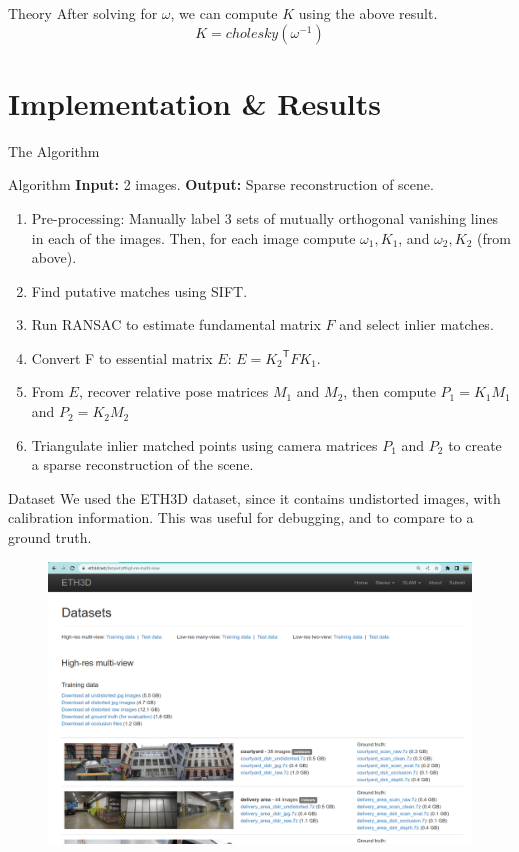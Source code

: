 \documentclass{beamer}
\begin{document}
\begin{frame}{Theory }
After solving for $ \omega $, we can compute $ K $ using the above result.
\[
K = cholesky\left(\omega^{-1}\right)
\]
\end{frame}

\section{Implementation \& Results}
\begin{frame}{The Algorithm}

\begin{block}{Algorithm}
\textbf{Input:} 2 images. \textbf{Output: }Sparse reconstruction of scene.
\begin{enumerate}
    \item Pre-processing: Manually label 3 sets of mutually orthogonal vanishing lines in each of the images. Then, for each image compute $ \omega_1, K_1 $, and $ \omega_2, K_2 $ (from above).
	\item Find putative matches using SIFT.
	\item Run RANSAC to estimate fundamental matrix $ F $ and select inlier matches.
	\item Convert F to essential matrix $ E $: $ E = {K_2}^\mathsf{T} F K_1 $.
	\item From $ E $, recover relative pose matrices $ M_1 $ and $ M_2 $, then compute $ P_1 = K_1 M_1 $ and $ P_2 = K_2 M_2 $
	\item Triangulate inlier matched points using camera matrices $ P_1 $ and $ P_2 $ to create a sparse reconstruction of the scene.
\end{enumerate}
\end{block}
\end{frame}  

\begin{frame}{Dataset}
	We used the ETH3D dataset, since it contains undistorted images, with calibration information. This was useful for debugging, and to compare to a ground truth.
\begin{figure}
\centering
\includegraphics[width=.60\textwidth]{./eth3d_screenshot.png}
\label{fig:ETH3D Dataset}
\end{figure}
\end{frame}	
\end{document}
